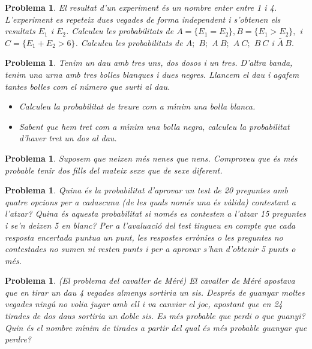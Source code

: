 \documentclass[11pt]{article}
\newcounter{prbcont}
\newtheorem{problema}[prbcont]{Problema}
\begin{document}
\begin{problema}
El resultat d'un experiment \'es un nombre enter entre 1 i 4. L'experiment es repeteix dues
vegades de forma independent i s'obtenen els resultats $E_1$ i $E_2$. Calculeu les probabilitats
de $A = \{E_1 = E_2\}, B = \{E_1 > E_2 \},$ i $C = \{E_1 + E_2 >6\}$. Calculeu les probabilitats de
$A;$ $B;$ $A \ B;$ $A \ C;$ $B \ C$ i $\bar{A} \ B.$
\end{problema}

\begin{problema}
Tenim un dau amb tres uns, dos dosos i un tres. D'altra banda, tenim una urna amb tres bolles blanques i dues negres. Llancem el dau i agafem tantes bolles com el n\'umero que surti al dau.
\begin{itemize}
\item [(a)] Calculeu la probabilitat de treure com a m\'{\i}nim una bolla blanca.
\item [(b)] Sabent que hem tret com a m\'{\i}nim una bolla negra, calculeu la probabilitat d'haver tret
un dos al dau.
\end{itemize}
\end{problema}

\begin{problema}
Suposem que neixen m\'es nenes que nens. Comproveu que \'es m\'es probable tenir dos fills
del mateix sexe que de sexe diferent.
\end{problema}

\begin{problema}
Quina \'es la probabilitat d'aprovar un test de 20 preguntes amb quatre opcions per a
cadascuna (de les quals nom\'es una \'es v\`alida) contestant a l'atzar? 
Quina \'es aquesta probabilitat si nom\'es es contesten a l'atzar 15 preguntes i se'n deixen 5 en blanc?
Per a l'avaluaci\'o del test tingueu en compte que cada resposta encertada puntua un punt, les respostes err\`onies o les preguntes no contestades no sumen ni resten punts i per a aprovar s'han d'obtenir 5 punts o m\'es. 
\end{problema}


\begin{problema}
(El problema del cavaller de M\'er\'e) El cavaller de M\'er\'e apostava que en tirar un dau 4 vegades almenys sortiria un sis. Despr\'es de guanyar moltes vegades ning\'u no volia jugar amb ell i va canviar el joc, apostant que en 24 tirades de dos daus sortiria un doble sis. Es m\'es probable que perdi o que guanyi? Quin \'es el nombre m\'{\i}nim de tirades a partir del qual \'es m\'es probable guanyar que perdre?
\end{problema}
\end{document}
